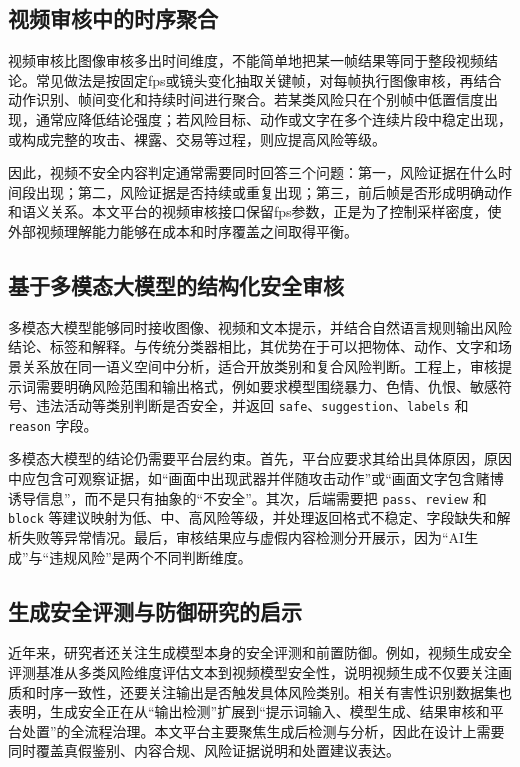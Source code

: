 \subsection{视频审核中的时序聚合}

视频审核比图像审核多出时间维度，不能简单地把某一帧结果等同于整段视频结论。常见做法是按固定fps或镜头变化抽取关键帧，对每帧执行图像审核，再结合动作识别、帧间变化和持续时间进行聚合。若某类风险只在个别帧中低置信度出现，通常应降低结论强度；若风险目标、动作或文字在多个连续片段中稳定出现，或构成完整的攻击、裸露、交易等过程，则应提高风险等级。

因此，视频不安全内容判定通常需要同时回答三个问题：第一，风险证据在什么时间段出现；第二，风险证据是否持续或重复出现；第三，前后帧是否形成明确动作和语义关系。本文平台的视频审核接口保留fps参数，正是为了控制采样密度，使外部视频理解能力能够在成本和时序覆盖之间取得平衡。

\subsection{基于多模态大模型的结构化安全审核}

多模态大模型能够同时接收图像、视频和文本提示，并结合自然语言规则输出风险结论、标签和解释。与传统分类器相比，其优势在于可以把物体、动作、文字和场景关系放在同一语义空间中分析，适合开放类别和复合风险判断。工程上，审核提示词需要明确风险范围和输出格式，例如要求模型围绕暴力、色情、仇恨、敏感符号、违法活动等类别判断是否安全，并返回 \texttt{safe}、\texttt{suggestion}、\texttt{labels} 和 \texttt{reason} 字段。

多模态大模型的结论仍需要平台层约束。首先，平台应要求其给出具体原因，原因中应包含可观察证据，如“画面中出现武器并伴随攻击动作”或“画面文字包含赌博诱导信息”，而不是只有抽象的“不安全”。其次，后端需要把 \texttt{pass}、\texttt{review} 和 \texttt{block} 等建议映射为低、中、高风险等级，并处理返回格式不稳定、字段缺失和解析失败等异常情况。最后，审核结果应与虚假内容检测分开展示，因为“AI生成”与“违规风险”是两个不同判断维度。

\subsection{生成安全评测与防御研究的启示}

近年来，研究者还关注生成模型本身的安全评测和前置防御。例如，视频生成安全评测基准从多类风险维度评估文本到视频模型安全性，说明视频生成不仅要关注画质和时序一致性，还要关注输出是否触发具体风险类别\cite{ref17}。相关有害性识别数据集也表明，生成安全正在从“输出检测”扩展到“提示词输入、模型生成、结果审核和平台处置”的全流程治理\cite{ref18}。本文平台主要聚焦生成后检测与分析，因此在设计上需要同时覆盖真假鉴别、内容合规、风险证据说明和处置建议表达。

